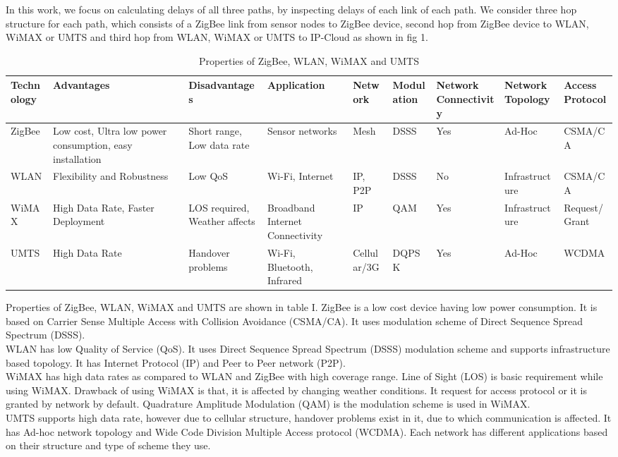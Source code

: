 \documentclass[11pt, conference, compsocconf, onecolumn]{IEEEtran}
\begin{document}
\indent In this work, we focus on calculating delays of all three paths, by inspecting delays of each link of each path. We consider three hop structure for each path, which consists of a ZigBee link from sensor nodes to ZigBee device, second hop from ZigBee device to WLAN, WiMAX or UMTS and third hop from WLAN, WiMAX or UMTS to IP-Cloud as shown in fig 1.\\
\begin{table*}
\caption{Properties of ZigBee, WLAN, WiMAX and UMTS}
\begin{center}
    \begin{tabular}{| p{1.3cm} | p{2.5cm} | p{2cm} | p{2cm} | p{1.3cm} | p{1.3cm}| p{1.5cm}| p{1.4cm}| p{1.5cm}|}
    \hline
    Technology & Advantages & Disadvantages & Application & Network & Modulation & Network Connectivity & Network Topology&Access Protocol \\ \hline
    ZigBee & Low cost, Ultra low power consumption, easy installation & Short range, Low data rate & Sensor networks & Mesh&DSSS & Yes & Ad-Hoc & CSMA/CA \\ \hline
    WLAN & Flexibility and Robustness  & Low QoS & Wi-Fi, Internet & IP, P2P & DSSS & No & Infrastructure & CSMA/CA  \\ \hline
    WiMAX&High Data Rate, Faster Deployment&LOS required, Weather affects&Broadband Internet Connectivity &IP&QAM&Yes&Infrastructure&Request/Grant\\ \hline
    UMTS & High Data Rate& Handover problems & Wi-Fi, Bluetooth, Infrared &Cellular/3G&DQPSK&Yes&Ad-Hoc& WCDMA\\ \hline
    \end{tabular}
\end{center}
\end{table*}
\indent Properties of ZigBee, WLAN, WiMAX and UMTS are shown in table I. ZigBee is a low cost device having low power consumption. It is based on Carrier Sense Multiple Access with Collision Avoidance (CSMA/CA). It uses modulation scheme of Direct Sequence Spread Spectrum (DSSS).\\
\indent WLAN has low Quality of Service (QoS). It uses Direct Sequence Spread Spectrum (DSSS) modulation scheme and supports infrastructure based topology. It has Internet Protocol (IP) and Peer to Peer network (P2P).\\
\indent WiMAX has high data rates as compared to WLAN and ZigBee with high coverage range. Line of Sight (LOS) is basic requirement while using WiMAX. Drawback of using WiMAX is that, it is affected by changing weather conditions. It request for access protocol or it is granted by network by default. Quadrature Amplitude Modulation (QAM) is the modulation scheme is used in WiMAX.\\
\indent UMTS supports high data rate, however due to cellular structure, handover problems exist in it, due to which communication is affected. It has Ad-hoc network topology and Wide Code Division Multiple Access protocol (WCDMA). Each network has different applications based on their structure and type of scheme they use.\\
\end{document}
